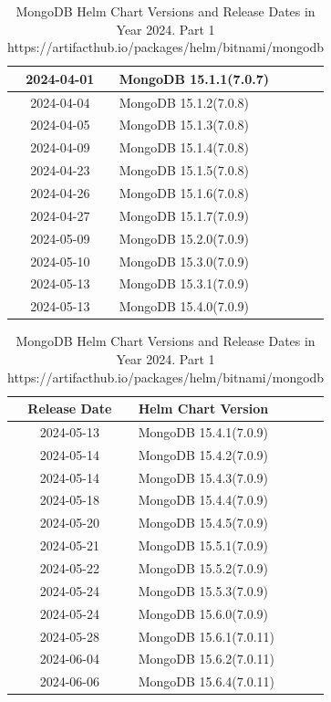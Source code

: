 \documentclass[../main.tex]{subfiles}
\begin{document}
\begin{table}[h]
\begin{minipage}{0.45\textwidth}
\begin{tabular}{|c|l|}
    2024-04-01 & MongoDB 15.1.1(7.0.7) \\ \hline  
    2024-04-04 & MongoDB 15.1.2(7.0.8) \\ \hline  
    2024-04-05 & MongoDB 15.1.3(7.0.8) \\ \hline  
    2024-04-09 & MongoDB 15.1.4(7.0.8) \\ \hline  
    2024-04-23 & MongoDB 15.1.5(7.0.8) \\ \hline  
    2024-04-26 & MongoDB 15.1.6(7.0.8) \\ \hline  
    2024-04-27 & MongoDB 15.1.7(7.0.9) \\ \hline
    2024-05-09 & MongoDB 15.2.0(7.0.9) \\ \hline  
    2024-05-10 & MongoDB 15.3.0(7.0.9) \\ \hline  
    2024-05-13 & MongoDB 15.3.1(7.0.9) \\ \hline  
    2024-05-13 & MongoDB 15.4.0(7.0.9) \\ \hline
\end{tabular}
\caption{MongoDB Helm Chart Versions and Release Dates in Year 2024. Part 1 https://artifacthub.io/packages/helm/bitnami/mongodb}
\end{minipage}
\hspace{1cm} %
\begin{minipage}{0.45\textwidth}
\centering
\begin{tabular}{|c|l|}
\hline
\textbf{Release Date} & \textbf{Helm Chart Version} \\ \hline
    2024-05-13 & MongoDB 15.4.1(7.0.9) \\ \hline
    2024-05-14 & MongoDB 15.4.2(7.0.9) \\ \hline
    2024-05-14 & MongoDB 15.4.3(7.0.9) \\ \hline
    2024-05-18 & MongoDB 15.4.4(7.0.9) \\ \hline 
    2024-05-20 & MongoDB 15.4.5(7.0.9) \\ \hline  
    2024-05-21 & MongoDB 15.5.1(7.0.9) \\ \hline  
    2024-05-22 & MongoDB 15.5.2(7.0.9) \\ \hline  
    2024-05-24 & MongoDB 15.5.3(7.0.9) \\ \hline  
    2024-05-24 & MongoDB 15.6.0(7.0.9) \\ \hline  
    2024-05-28 & MongoDB 15.6.1(7.0.11) \\ \hline
    2024-06-04 & MongoDB 15.6.2(7.0.11) \\ \hline  
    2024-06-06 & MongoDB 15.6.4(7.0.11) \\ \hline  

\end{tabular}
\end{minipage}
\end{table}
\end{document}
